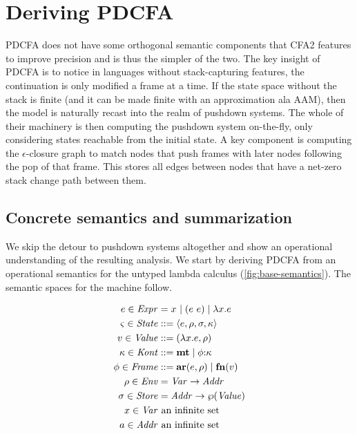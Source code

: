 \section{Deriving PDCFA}
\label{sec:pdcfa}

PDCFA does not have some orthogonal semantic components that CFA2 features to improve precision and is thus the simpler of the two.
%
The key insight of PDCFA is to notice in languages without stack-capturing features, the continuation is only modified a frame at a time.
%
If the state space without the stack is finite (and it can be made finite with an approximation ala AAM), then the model is naturally recast into the realm of pushdown systems.
%
The whole of their machinery is then computing the pushdown system on-the-fly, only considering states reachable from the initial state.
%
A key component is computing the $\epsilon$-closure graph to match nodes that push frames with later nodes following the pop of that frame.
%
This stores all edges between nodes that have a net-zero stack change path between them.
%

\subsection{Concrete semantics and summarization}
We skip the detour to pushdown systems altogether and show an operational understanding of the resulting analysis.
%
We start by deriving PDCFA from an operational semantics for the untyped lambda calculus (\autoref{fig:base-semantics}).
%
The semantic spaces for the machine follow.

{
\setlength{\abovedisplayskip}{0pt}
\setlength{\belowdisplayskip}{4pt}
\setlength{\abovedisplayshortskip}{0pt}
\setlength{\belowdisplayshortskip}{8pt}
\begin{align*}
  e \in \mathit{Expr} &= x^{{}} \mathrel{\mid} (e\ e){} \mathrel{\mid} \lambda{} x. e \\
  \varsigma \in \mathit{State} &::= \langle e,\rho,\sigma,\kappa \rangle \\
  v \in \mathit{Value} &::= (\lambda{} x. e, \rho) \\
  \kappa \in \mathit{Kont} &::= \mathbf{mt} \mathrel{\mid} \phi{\tt :} \kappa \\
  \phi \in \mathit{Frame} &::= \mathbf{ar}{}(e,\rho) \mathrel{\mid} \mathbf{fn}{}(v) \\
  \rho \in \mathit{Env} &= \mathit{Var} \to \mathit{Addr} \\
  \sigma \in \mathit{Store} &= \mathit{Addr} \to \wp(\mathit{Value}) \\
  x \in \mathit{Var} &\text{ an infinite set} \\
  a \in \mathit{Addr} &\text{ an infinite set}
\end{align*}
}

